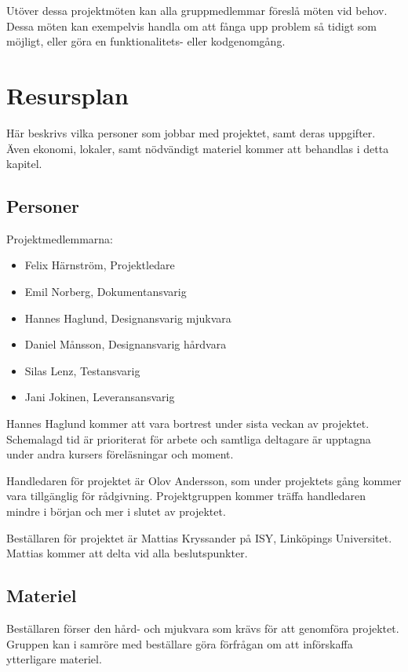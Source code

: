 \documentclass[a4paper,11pt]{article}
\newcommand{\LIPShandledare}{Olov Andersson}
\begin{document}
    Utöver dessa projektmöten kan alla gruppmedlemmar föreslå möten vid behov. Dessa möten kan exempelvis handla om att fånga upp problem så tidigt som möjligt, eller göra en funktionalitets- eller kodgenomgång.
    
    \section{Resursplan}
    Här beskrivs vilka personer som jobbar med projektet, samt deras uppgifter. Även ekonomi, lokaler, samt nödvändigt materiel kommer att behandlas i detta kapitel.
    
    \subsection{Personer}
    Projektmedlemmarna:
    \begin{itemize}
        \item Felix Härnström, Projektledare
        \item Emil Norberg, Dokumentansvarig
        \item Hannes Haglund, Designansvarig mjukvara
        \item Daniel Månsson, Designansvarig hårdvara
        \item Silas Lenz, Testansvarig
        \item Jani Jokinen, Leveransansvarig
    \end{itemize}
    Hannes Haglund kommer att vara bortrest under sista veckan av projektet.
    Schemalagd tid är prioriterat för arbete och samtliga deltagare är upptagna under andra kursers föreläsningar och moment.
    
    Handledaren för projektet är \LIPShandledare , som under projektets gång kommer vara tillgänglig för rådgivning. Projektgruppen kommer träffa handledaren mindre i början och mer i slutet av projektet.
    
    Beställaren för projektet är  Mattias Kryssander på ISY, Linköpings Universitet. Mattias kommer att delta vid alla beslutspunkter.
    
    \subsection{Materiel}
    Beställaren förser den hård- och mjukvara som krävs för att genomföra projektet. Gruppen kan i samröre med beställare göra förfrågan om att införskaffa ytterligare materiel. 
    
\end{document}
